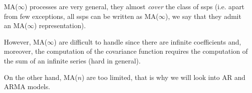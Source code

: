 \begin{obs}
MA($\infty$) processes are very general, they almost \emph{cover} the class of \glspl{ssp} (i.e. apart from few exceptions, all \glspl{ssp} can be written as MA($\infty$), we say that they admit an MA($\infty$) representation).

However, MA($\infty$) are difficult to handle since there are infinite coefficients and, moreover, the computation of the covariance function requires the computation of the sum of an infinite series (hard in general).

On the other hand, MA($n$) are too limited, that is why we will look into AR and ARMA models.
\end{obs}